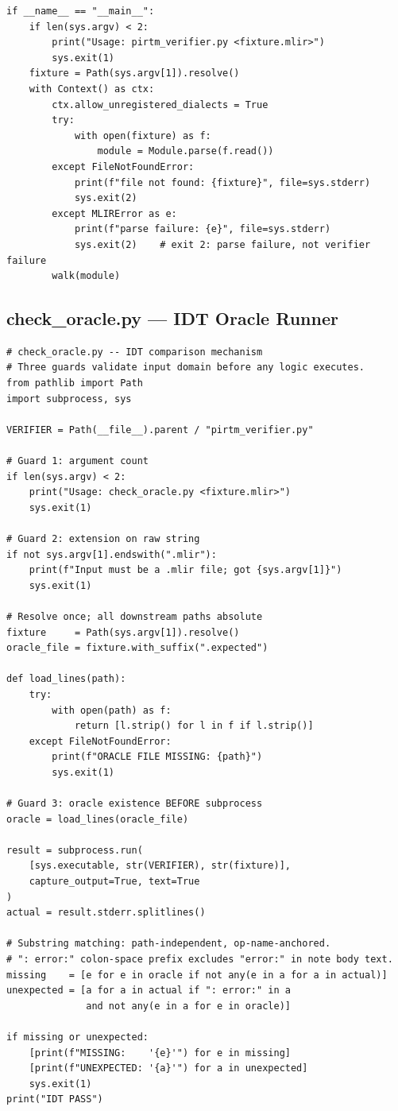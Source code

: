 \documentclass[11pt,letterpaper]{article}
\theoremstyle{pirtmthm}
\theoremstyle{remark}
\begin{document}
\begin{lstlisting}[style=python,
  caption={pirtm\_verifier.py --- Verifier with get\_stratum, check\_valid\_call, walk, and entrypoint}]
if __name__ == "__main__":
    if len(sys.argv) < 2:
        print("Usage: pirtm_verifier.py <fixture.mlir>")
        sys.exit(1)
    fixture = Path(sys.argv[1]).resolve()
    with Context() as ctx:
        ctx.allow_unregistered_dialects = True
        try:
            with open(fixture) as f:
                module = Module.parse(f.read())
        except FileNotFoundError:
            print(f"file not found: {fixture}", file=sys.stderr)
            sys.exit(2)
        except MLIRError as e:
            print(f"parse failure: {e}", file=sys.stderr)
            sys.exit(2)    # exit 2: parse failure, not verifier failure
        walk(module)
\end{lstlisting}

\subsection{check\_oracle.py --- IDT Oracle Runner}

\begin{lstlisting}[style=python,
  caption={check\_oracle.py --- Full input-domain validation; substring oracle matching}]
# check_oracle.py -- IDT comparison mechanism
# Three guards validate input domain before any logic executes.
from pathlib import Path
import subprocess, sys

VERIFIER = Path(__file__).parent / "pirtm_verifier.py"

# Guard 1: argument count
if len(sys.argv) < 2:
    print("Usage: check_oracle.py <fixture.mlir>")
    sys.exit(1)

# Guard 2: extension on raw string
if not sys.argv[1].endswith(".mlir"):
    print(f"Input must be a .mlir file; got {sys.argv[1]}")
    sys.exit(1)

# Resolve once; all downstream paths absolute
fixture     = Path(sys.argv[1]).resolve()
oracle_file = fixture.with_suffix(".expected")

def load_lines(path):
    try:
        with open(path) as f:
            return [l.strip() for l in f if l.strip()]
    except FileNotFoundError:
        print(f"ORACLE FILE MISSING: {path}")
        sys.exit(1)

# Guard 3: oracle existence BEFORE subprocess
oracle = load_lines(oracle_file)

result = subprocess.run(
    [sys.executable, str(VERIFIER), str(fixture)],
    capture_output=True, text=True
)
actual = result.stderr.splitlines()

# Substring matching: path-independent, op-name-anchored.
# ": error:" colon-space prefix excludes "error:" in note body text.
missing    = [e for e in oracle if not any(e in a for a in actual)]
unexpected = [a for a in actual if ": error:" in a
              and not any(e in a for e in oracle)]

if missing or unexpected:
    [print(f"MISSING:    '{e}'") for e in missing]
    [print(f"UNEXPECTED: '{a}'") for a in unexpected]
    sys.exit(1)
print("IDT PASS")
\end{lstlisting}
\end{document}
